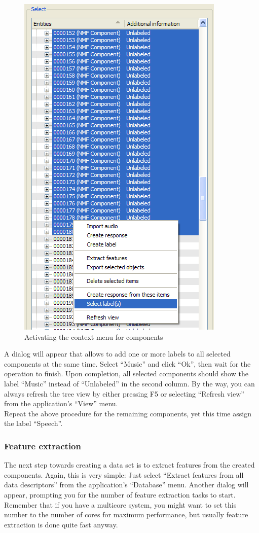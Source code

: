 \begin{figure}
    \centering
    \includegraphics[width=.6\textwidth]{tutorial-media/SelectLabels.png}
    \caption{%
        \label{figure:TutorialSelectLabels}%
        Activating the context menu for components
    }
\end{figure}

A dialog will appear that allows to add one or more labels to all selected
components at the same time. Select ``Music'' and click ``Ok'', then wait for
the operation to finish. Upon completion, all selected components should show
the label ``Music'' instead of ``Unlabeled'' in the second column. By the way,
you can always refresh the tree view by either pressing F5 or selecting
``Refresh view'' from the application's ``View'' menu.\\

Repeat the above procedure for the remaining components, yet this time assign
the label ``Speech''.


\subsubsection{Feature extraction}

The next step towards creating a data set is to extract features from the
created components. Again, this is very simple: Just select ``Extract features
from all data descriptors'' from the application's ``Database'' menu. Another
dialog will appear, prompting you for the number of feature extraction tasks to
start.  Remember that if you have a multicore system, you might want to set this
number to the number of cores for maximum performance, but usually feature
extraction is done quite fast anyway.\\

